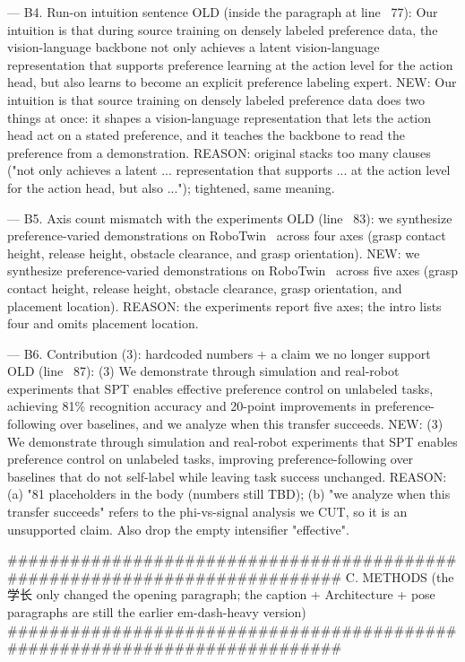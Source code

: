 --- B4.  Run-on intuition sentence
OLD (inside the paragraph at line ~77):
  Our intuition is that during source training on densely labeled preference data, the vision-language backbone not only achieves a latent vision-language representation that supports preference learning at the action level for the action head, but also learns to become an explicit preference labeling expert.
NEW:
  Our intuition is that source training on densely labeled preference data does two things at once: it shapes a vision-language representation that lets the action head act on a stated preference, and it teaches the backbone to read the preference from a demonstration.
REASON: original stacks too many clauses ("not only achieves a latent ...
  representation that supports ... at the action level for the action head,
  but also ..."); tightened, same meaning.


--- B5.  Axis count mismatch with the experiments
OLD (line ~83):
  we synthesize preference-varied demonstrations on RoboTwin~\citep{robotwin} across four axes (grasp contact height, release height, obstacle clearance, and grasp orientation).
NEW:
  we synthesize preference-varied demonstrations on RoboTwin~\citep{robotwin} across five axes (grasp contact height, release height, obstacle clearance, grasp orientation, and placement location).
REASON: the experiments report five axes; the intro lists four and omits
  placement location.


--- B6.  Contribution (3): hardcoded numbers + a claim we no longer support
OLD (line ~87):
  (3) We demonstrate through simulation and real-robot experiments that SPT enables effective preference control on unlabeled tasks, achieving 81\% recognition accuracy and 20-point improvements in preference-following over baselines, and we analyze when this transfer succeeds.
NEW:
  (3) We demonstrate through simulation and real-robot experiments that SPT enables preference control on unlabeled tasks, improving preference-following over baselines that do not self-label while leaving task success unchanged.
REASON: (a) "81%
  placeholders in the body (numbers still TBD); (b) "we analyze when this
  transfer succeeds" refers to the phi-vs-signal analysis we CUT, so it is an
  unsupported claim. Also drop the empty intensifier "effective".


###########################################################################
C. METHODS   (the 学长 only changed the opening paragraph; the caption +
   Architecture + pose paragraphs are still the earlier em-dash-heavy version)
###########################################################################

